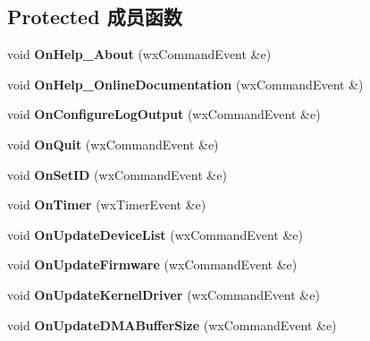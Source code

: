 \subsection*{Protected 成员函数}
\begin{DoxyCompactItemize}
\item 
\hypertarget{class_device_configure_frame_a862807118ee02ac12783f46b91728d5b}{void {\bfseries On\+Help\+\_\+\+About} (wx\+Command\+Event \&e)}\label{class_device_configure_frame_a862807118ee02ac12783f46b91728d5b}

\item 
\hypertarget{class_device_configure_frame_a2ca35c42c9b5d6220c341340477d5e72}{void {\bfseries On\+Help\+\_\+\+Online\+Documentation} (wx\+Command\+Event \&)}\label{class_device_configure_frame_a2ca35c42c9b5d6220c341340477d5e72}

\item 
\hypertarget{class_device_configure_frame_ab6925d2cb7439083b5a43cfe6febdd41}{void {\bfseries On\+Configure\+Log\+Output} (wx\+Command\+Event \&e)}\label{class_device_configure_frame_ab6925d2cb7439083b5a43cfe6febdd41}

\item 
\hypertarget{class_device_configure_frame_a2c04b6c364920e00f6ad37e0f21f3b33}{void {\bfseries On\+Quit} (wx\+Command\+Event \&e)}\label{class_device_configure_frame_a2c04b6c364920e00f6ad37e0f21f3b33}

\item 
\hypertarget{class_device_configure_frame_a8b24a8b78138322874351acdef8c49fb}{void {\bfseries On\+Set\+I\+D} (wx\+Command\+Event \&e)}\label{class_device_configure_frame_a8b24a8b78138322874351acdef8c49fb}

\item 
\hypertarget{class_device_configure_frame_aa0f260dd6b13d5c1ef766233bd55425d}{void {\bfseries On\+Timer} (wx\+Timer\+Event \&e)}\label{class_device_configure_frame_aa0f260dd6b13d5c1ef766233bd55425d}

\item 
\hypertarget{class_device_configure_frame_a4af6aaead2fb91e57cbb8f23d35921f1}{void {\bfseries On\+Update\+Device\+List} (wx\+Command\+Event \&e)}\label{class_device_configure_frame_a4af6aaead2fb91e57cbb8f23d35921f1}

\item 
\hypertarget{class_device_configure_frame_a389a4a9d202a3085541083f051a32dcb}{void {\bfseries On\+Update\+Firmware} (wx\+Command\+Event \&e)}\label{class_device_configure_frame_a389a4a9d202a3085541083f051a32dcb}

\item 
\hypertarget{class_device_configure_frame_ad497adfe76b4688a030ae85f68f52f3e}{void {\bfseries On\+Update\+Kernel\+Driver} (wx\+Command\+Event \&e)}\label{class_device_configure_frame_ad497adfe76b4688a030ae85f68f52f3e}

\item 
\hypertarget{class_device_configure_frame_a13ed543739acc49aeb5eeb444dff3fd4}{void {\bfseries On\+Update\+D\+M\+A\+Buffer\+Size} (wx\+Command\+Event \&e)}\label{class_device_configure_frame_a13ed543739acc49aeb5eeb444dff3fd4}

\end{DoxyCompactItemize}


